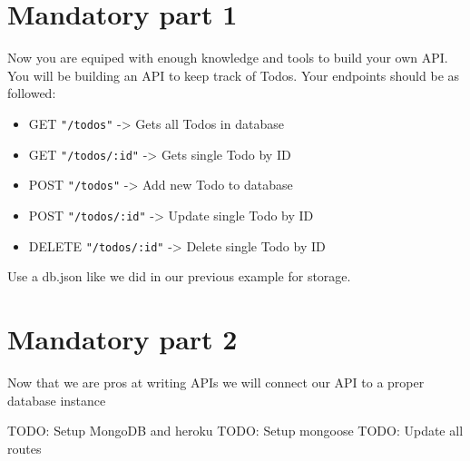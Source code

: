 \documentclass{42-en}
\begin{document}
\newpage
\nextexercice

\chapter{Mandatory part 1}

Now you are equiped with enough knowledge and tools to build your own API. You will be building an API to keep track of Todos. Your endpoints should be as followed:

\begin{itemize}\itemsep1pt
\item GET \texttt{"/todos"} -> Gets all Todos in database
\item GET \texttt{"/todos/:id"} -> Gets single Todo by ID
\item POST \texttt{"/todos"} -> Add new Todo to database
\item POST \texttt{"/todos/:id"} -> Update single Todo by ID
\item DELETE \texttt{"/todos/:id"} -> Delete single Todo by ID
\end{itemize}

Use a db.json like we did in our previous example for storage.


\chapter{Mandatory part 2}

Now that we are pros at writing APIs we will connect our API to a proper database instance

TODO: Setup MongoDB and heroku
TODO: Setup mongoose
TODO: Update all routes
\end{document}
